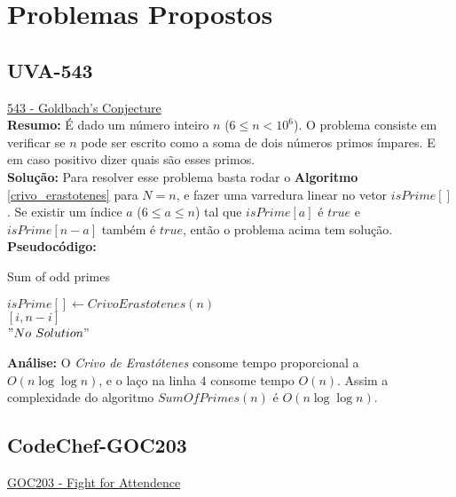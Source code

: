 \section{Problemas Propostos}



\subsection{UVA-543}
\href{https://uva.onlinejudge.org/index.php?option=onlinejudge&page=show_problem&problem=484}{543 - Goldbach's Conjecture}\\

\textbf{Resumo:} 
É dado um número inteiro $n$ ($6 \leq n < 10^6$). O problema consiste em verificar se $n$ pode ser escrito como a soma de dois números
primos ímpares. E em caso positivo dizer quais são esses primos.
\\

\textbf{Solução:}
Para resolver esse problema basta rodar o \textbf{Algoritmo} \autoref{crivo_erastotenes} para $N=n$, e fazer uma varredura linear no vetor $isPrime[]$. Se existir um índice $a$ ($6 \leq a \leq n$) tal que $isPrime[a]$ é $true$ e $isPrime[n-a]$ também é $true$, então o problema acima tem solução. 
\\

\textbf{Pseudocódigo:}
\begin{algorithm}
\caption{Sum of odd primes}
\begin{algorithmic}[1]
\State $isPrime[] \gets CrivoErastotenes(n)$
\\
\State \Return $[i, n-i]$
\EndIf
\EndFor
\\
\State \Return $"No$ $Solution"$
\EndProcedure
\end{algorithmic}
\end{algorithm}

\textbf{Análise:}
O \textit{Crivo de Erastótenes} consome tempo proporcional a $O(n \log \log n)$, e o laço na linha $4$ consome tempo $O(n)$. Assim a complexidade do algoritmo $SumOfPrimes(n)$ é $O(n \log \log n)$.

\subsection{CodeChef-GOC203}
\href{https://www.codechef.com/problems/GOC203}{GOC203 - Fight for Attendence}\\

